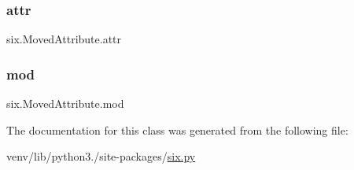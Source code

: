 \subsubsection{\texorpdfstring{attr}{attr}}
{\footnotesize\ttfamily six.\+Moved\+Attribute.\+attr}

\mbox{\label{classsix_1_1MovedAttribute_af2ed71d99c69389444c7b887df9f6e33}} 
\subsubsection{\texorpdfstring{mod}{mod}}
{\footnotesize\ttfamily six.\+Moved\+Attribute.\+mod}



The documentation for this class was generated from the following file\+:\begin{DoxyCompactItemize}
\item 
venv/lib/python3./site-\/packages/\hyperlink{six_8py}{six.\+py}\end{DoxyCompactItemize}
